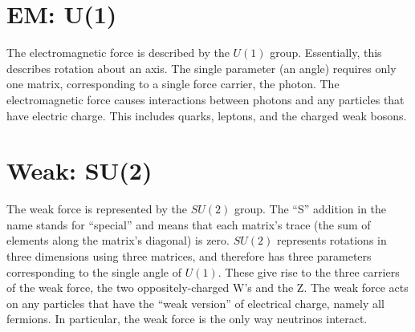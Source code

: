 \section{EM: U(1)}
The electromagnetic force is described by the $U(1)$ group.  
Essentially, this describes rotation about an axis.  %
The single parameter (an angle) requires only one matrix, 
corresponding to a single %
force carrier, the photon.  
The electromagnetic force causes interactions between 
photons and any particles that have electric charge.  
This includes quarks, leptons, and the charged weak bosons.  

\section{Weak: SU(2)}
The weak force is represented by the $SU(2)$ group.  
The ``S'' addition in the name stands for ``special'' 
and means that each matrix's trace 
(the sum of elements along the matrix's diagonal) is zero.  
$SU(2)$ represents rotations in three dimensions 
using three matrices, 
and therefore has three parameters corresponding 
to the single angle of $U(1)$.  
These give rise to the three carriers of the weak force, 
the two oppositely-charged W's and the Z.  %
The weak force acts on any particles that have the ``weak 
version'' of electrical charge, %
namely all fermions.  
In particular, the weak force is the only way 
neutrinos interact.  

